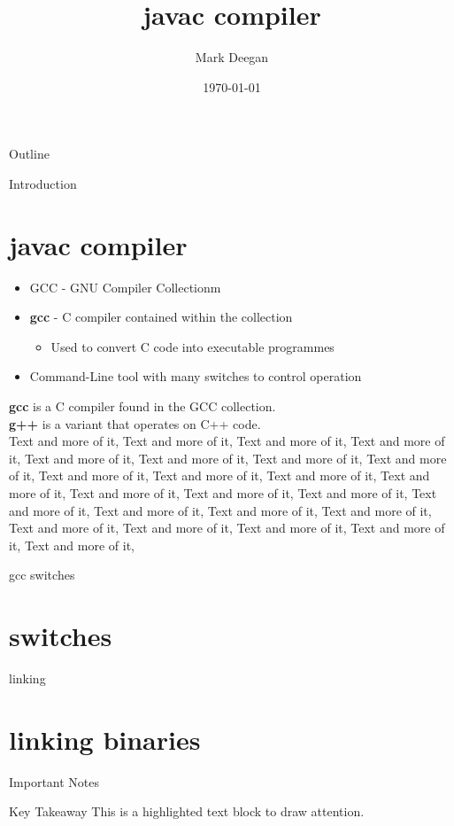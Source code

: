 \documentclass{beamer}
\title{\textbf{javac compiler}}
\author{Mark Deegan}
\institute{TU Dublin}
\date{\today}
\begin{document}
\begin{frame}
    \maketitle
\end{frame}

\begin{frame}{Outline}
    \tableofcontents
\end{frame}

\begin{frame}[allowframebreaks]{Introduction}
    \section{javac compiler}
    \begin{itemize}
        \item GCC - GNU Compiler Collectionm
        \item \textbf{gcc} - C compiler contained within the collection
        \begin{itemize}
            \item Used to convert C code into executable programmes
        \end{itemize}
        \item Command-Line tool with many switches to control operation
    \end{itemize}
    \textbf{gcc} is a C compiler found in the GCC collection.
    \\
    \textbf{g++} is a variant that operates on C++ code.
    \\
    \framebreak
    Text and more of it, Text and more of it, Text and more of it, Text and more of it, Text and more of it, Text and more of it, Text and more of it, Text and more of it, Text and more of it, Text and more of it, Text and more of it, Text and more of it, Text and more of it, \framebreak
    Text and more of it, Text and more of it, Text and more of it, Text and more of it, Text and more of it, Text and more of it, Text and more of it, Text and more of it, Text and more of it, Text and more of it, Text and more of it, 
\end{frame}

\begin{frame}[allowframebreaks]{gcc switches}
    \section{switches}
\end{frame}

\begin{frame}[allowframebreaks]{linking}
    \section{linking binaries}
\end{frame}

\begin{frame}{Important Notes}
    \begin{block}{Key Takeaway}
        This is a highlighted text block to draw attention.
    \end{block}
\end{frame}
\end{document}
